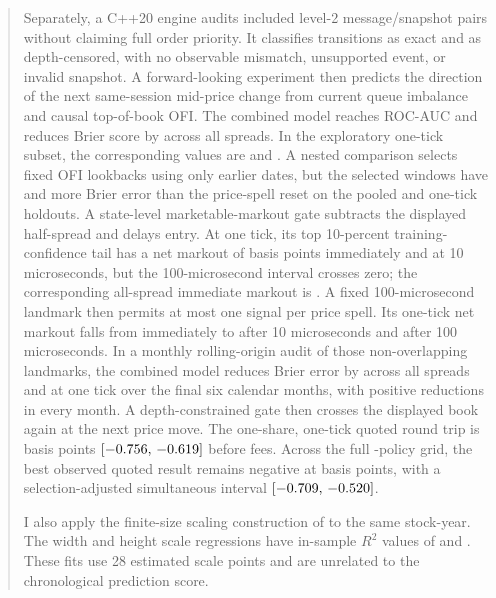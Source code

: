 \documentclass[11pt,a4paper]{article}
\newcommand{\Rtwo}{\ensuremath{R^2}}
\begin{document}
\begin{abstract}
Separately, a C++20 engine audits \ReplayEvents{} included level-2
message/snapshot pairs without claiming full order priority. It classifies
\ReplayExact{} transitions as exact and \ReplayCensored{} as depth-censored,
with no observable mismatch, unsupported event, or invalid snapshot. A
forward-looking experiment then predicts the direction of the next same-session
mid-price change from current queue imbalance and causal top-of-book OFI. The
combined model reaches ROC-AUC \CombinedAllAuc{} and reduces Brier score by
\CombinedAllBrierReduction{} across all spreads. In the exploratory one-tick
subset, the corresponding values are \CombinedOneTickAuc{} and
\CombinedOneTickBrierReduction{}. A nested comparison selects fixed OFI
lookbacks using only earlier dates, but the selected windows have
\OfiFixedAllPenalty{} and \OfiFixedOneTickPenalty{} more Brier error than the
price-spell reset on the pooled and one-tick holdouts. A state-level
marketable-markout gate subtracts the displayed half-spread and delays entry.
At one tick, its top
10-percent training-confidence tail has a net markout of
\MarkoutOneTickZeroNet{} basis points immediately and \MarkoutOneTickTenNet{}
at 10 microseconds, but the 100-microsecond interval crosses zero; the
corresponding all-spread immediate markout is \MarkoutAllZeroNet{}. A fixed
100-microsecond landmark then permits at most one signal per price spell. Its
one-tick net markout falls from \LandmarkOneTickZeroNet{} immediately to
\LandmarkOneTickTenNet{} after 10 microseconds and
\LandmarkOneTickHundredNet{} after 100 microseconds. In a monthly rolling-origin
audit of those non-overlapping landmarks, the combined model reduces Brier
error by \RollingAllBrierReduction{} across all spreads and
\RollingOneTickBrierReduction{} at one tick over the final six calendar
months, with positive reductions in every month. A depth-constrained gate then
crosses the displayed book again at the next price move. The one-share,
one-tick quoted round trip is \RoundTripOneOnePnl{} basis points
$[\RoundTripOneOneLower{},\,\RoundTripOneOneUpper{}]$ before fees. Across the
full \PolicyFamilyRows{}-policy grid, the best observed quoted result remains
negative at \PolicyBestPnl{} basis points, with a selection-adjusted
simultaneous interval
$[\PolicyBestSimLower{},\,\PolicyBestSimUpper{}]$.

I also apply the finite-size scaling construction of \citet{patzelt2018} to the
same stock-year. The width and height scale regressions have in-sample \Rtwo{}
values of \WidthFitRtwo{} and \HeightFitRtwo{}. These fits use 28 estimated
scale points and are unrelated to the chronological prediction score.
\end{abstract}
\end{document}
